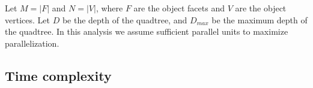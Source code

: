 \documentclass[final,3p,times,twocolumn]{elsarticle}
\begin{document}


%


\appendix


Let $M = |F|$ and $N = |V|$, where $F$ are the object facets and $V$ are the object vertices. Let $D$ be the depth of the quadtree, and $D_{max}$ be the maximum depth of the quadtree. In this analysis we assume sufficient parallel units to maximize parallelization.

\subsection*{Time complexity}
\end{document}
